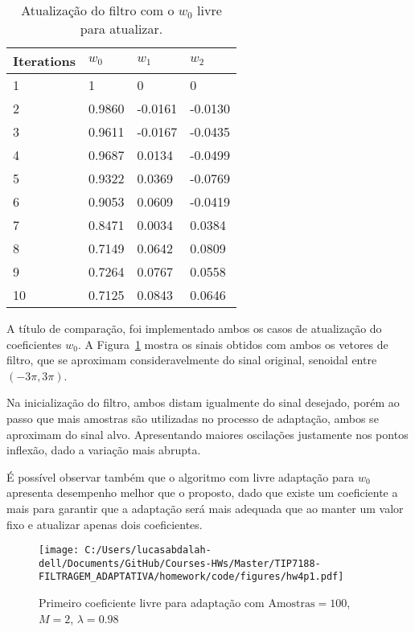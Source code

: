 \begin{table}[!htp]
    \centering
    \begin{tabular}{l l l l}
        \hline
        Iterations & $w_{0}$ & $w_{1}$ & $w_{2}$ \\ 
        \hline \hline
        1 & 1 & 0 & 0 \\ \hline
        2 & 0.9860 & -0.0161 & -0.0130 \\ \hline
        3 & 0.9611 & -0.0167 & -0.0435 \\ \hline
        4 & 0.9687 & 0.0134 & -0.0499 \\ \hline
        5 & 0.9322 & 0.0369 & -0.0769 \\ \hline
        6 & 0.9053 & 0.0609 & -0.0419 \\ \hline
        7 & 0.8471 & 0.0034 & 0.0384 \\ \hline
        8 & 0.7149 & 0.0642 & 0.0809 \\ \hline
        9 & 0.7264 & 0.0767 & 0.0558 \\ \hline
        10 & 0.7125 & 0.0843 & 0.0646 \\ \hline
    \end{tabular}
    \caption{Atualização do filtro com o $w_0$ livre para atualizar.}
    \label{tab:freecoef}
\end{table}

A título de comparação, foi implementado ambos os casos de atualização do coeficientes $w_0$. A Figura~\ref{fig:hw4p1} mostra os sinais obtidos com ambos os vetores de filtro, que se aproximam consideravelmente do sinal original, senoidal entre $(-3\pi,3\pi)$.

Na inicialização do filtro, ambos distam igualmente do sinal desejado, porém ao passo que mais amostras são utilizadas no processo de adaptação, ambos se aproximam do sinal alvo. Apresentando maiores oscilações justamente nos pontos inflexão, dado a variação mais abrupta.

É possível observar também que o algoritmo com livre adaptação para $w_0$ apresenta desempenho melhor que o proposto, dado que existe um coeficiente a mais para garantir que a adaptação será mais adequada que ao manter um valor fixo e atualizar apenas dois coeficientes.

\clearpage

\begin{figure}[!htp]
    \centering
    \texttt{[image: C:/Users/lucasabdalah-dell/Documents/GitHub/Courses-HWs/Master/TIP7188-FILTRAGEM\_ADAPTATIVA/homework/code/figures/hw4p1.pdf]}
    \caption{Primeiro coeficiente livre para adaptação com $\text{Amostras} = 100$, $M = 2$, $\lambda = 0.98$}
    \label{fig:hw4p1}
\end{figure}



